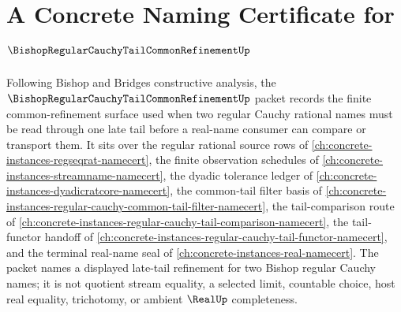 \chapter{A Concrete Naming Certificate for $\BishopRegularCauchyTailCommonRefinementUp$}
\label{ch:concrete-instances-bishop-regular-cauchy-tail-common-refinement-namecert}

Following Bishop and Bridges constructive analysis, the $\BishopRegularCauchyTailCommonRefinementUp$ packet records the finite common-refinement surface used when two regular Cauchy rational names must be read through one late tail before a real-name consumer can compare or transport them. It sits over the regular rational source rows of \autoref{ch:concrete-instances-regseqrat-namecert}, the finite observation schedules of \autoref{ch:concrete-instances-streamname-namecert}, the dyadic tolerance ledger of \autoref{ch:concrete-instances-dyadicratcore-namecert}, the common-tail filter basis of \autoref{ch:concrete-instances-regular-cauchy-common-tail-filter-namecert}, the tail-comparison route of \autoref{ch:concrete-instances-regular-cauchy-tail-comparison-namecert}, the tail-functor handoff of \autoref{ch:concrete-instances-regular-cauchy-tail-functor-namecert}, and the terminal real-name seal of \autoref{ch:concrete-instances-real-namecert}. The packet names a displayed late-tail refinement for two Bishop regular Cauchy names; it is not quotient stream equality, a selected limit, countable choice, host real equality, trichotomy, or ambient $\RealUp$ completeness.

